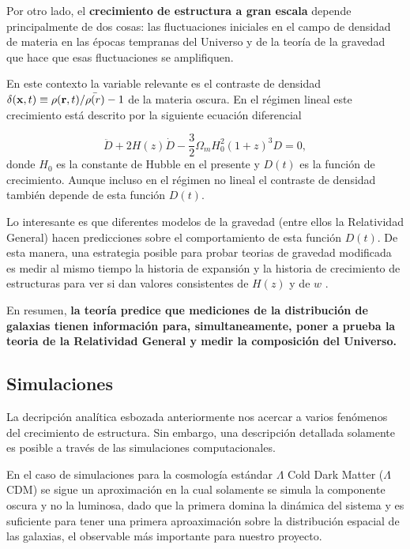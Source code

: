Por otro lado, el {\bf crecimiento de estructura a gran escala} depende
principalmente de dos cosas: las fluctuaciones iniciales en el campo de densidad
de materia en las \'epocas tempranas del Universo y de la teor\'ia de
la gravedad que hace que esas fluctuaciones se amplifiquen.

En este contexto la variable relevante es el contraste de
densidad $\delta({\bf  x},t)\equiv\rho({\bf r},t)/\bar{\rho(r)}-1$ de
la materia oscura. 
En el r\'egimen lineal este crecimiento está descrito 
por la siguiente ecuaci\'on diferencial 

\begin{equation}
\ddot{D} + 2H(z)\dot{D}- \frac{3}{2}\Omega_mH_{0}^2(1+z)^3D=0,
\end{equation}
%
donde $H_0$ es la constante de Hubble en el presente y $D(t)$ es la
funci\'on de crecimiento. 
Aunque incluso en el r\'egimen no lineal el contraste de densidad
tambi\'en depende de esta funci\'on $D(t)$.   

Lo interesante es que diferentes modelos de la gravedad
(entre ellos la Relatividad General) hacen predicciones sobre el
comportamiento de esta funci\'on $D(t)$. 
De esta manera, una estrategia posible para probar teorias de gravedad
modificada es medir al mismo tiempo la historia de expansi\'on y la
historia de crecimiento de estructuras para ver si dan valores
consistentes de $H(z)$ y de $w$ \cite{2014arXiv1401.0046M}.  

En resumen, {\bf la teor\'ia predice que mediciones de la distribuci\'on de
galaxias tienen informaci\'on para, simultaneamente, poner a prueba la
teoria de la Relatividad General y medir la composici\'on del
Universo.} 

\subsection{Simulaciones}

La decripci\'on anal\'itica esbozada anteriormente
nos acercar a varios fen\'omenos del crecimiento de estructura.
Sin embargo, una descripci\'on detallada solamente es posible a
trav\'es de las simulaciones computacionales. 


En el caso de simulaciones para la cosmolog\'ia est\'andar $\Lambda$
Cold Dark Matter ($\Lambda$CDM) se sigue un aproximaci\'on en la cual
solamente se simula la componente oscura y no la luminosa, dado que
la primera domina la din\'amica del sistema y es suficiente para tener
una primera aproaximación sobre la distribución espacial de las
galaxias, el observable más importante para nuestro proyecto.


